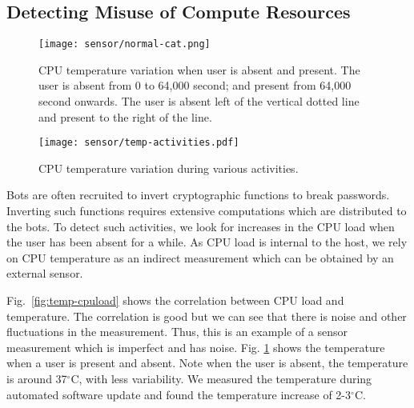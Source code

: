 \subsection{Detecting Misuse of Compute Resources} \label{subsec:passwordcrack}

\begin{figure}[tb]
\centering
\texttt{[image: sensor/normal-cat.png]}
\caption{CPU temperature variation when user is absent and present. 
The user is absent from 0 to 64,000 second;
and present from 64,000 second onwards. The user is absent left of
the vertical dotted line and present to the right of the line.
} 
\label{fig:temp-norm}
\end{figure}


\begin{figure}[tb]
\centering
\texttt{[image: sensor/temp-activities.pdf]}
\caption{CPU temperature variation during various
activities. } \label{fig:temp-activities}
\end{figure}

Bots are often recruited to invert cryptographic functions to break
passwords. Inverting such functions requires extensive computations
which are distributed to the bots. To detect such activities, we
look for increases in the CPU load when the user has been absent for a
while. As CPU load is internal to the host,
we rely on CPU temperature as an indirect measurement which can
be obtained by an external sensor.

Fig.~\ref{fig:temp-cpuload} shows the correlation between CPU load
and temperature.
The correlation is good but we can see that there is
noise and other fluctuations in the measurement.
Thus, this is an example of a sensor measurement which is imperfect and
has noise.
Fig. \ref{fig:temp-norm} shows the temperature when a user
is present and absent. Note when the user is absent, the temperature
is around 37$^\circ$C, with less variability.  We measured the
temperature during automated software update and found the
temperature increase of 2-3$^\circ$C.

